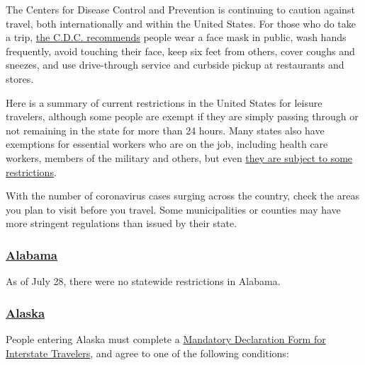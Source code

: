 The Centers for Disease Control and Prevention is continuing to caution
against travel, both internationally and within the United States. For
those who do take a trip,
\href{https://www.cdc.gov/coronavirus/2019-ncov/travelers/travel-in-the-us.html}{the
C.D.C. recommends} people wear a face mask in public, wash hands
frequently, avoid touching their face, keep six feet from others, cover
coughs and sneezes, and use drive-through service and curbside pickup at
restaurants and stores.

Here is a summary of current restrictions in the United States for
leisure travelers, although some people are exempt if they are simply
passing through or not remaining in the state for more than 24 hours.
Many states also have exemptions for essential workers who are on the
job, including health care workers, members of the military and others,
but even
\href{https://www.ncsl.org/research/labor-and-employment/covid-19-essential-workers-in-the-states.aspx}{they
are subject to some restrictions}.

With the number of coronavirus cases surging across the country, check
the areas you plan to visit before you travel. Some municipalities or
counties may have more stringent regulations than issued by their state.

\hypertarget{alabama}{%
\subsubsection{\texorpdfstring{\href{https://alabama.travel/my-trip/staying-safe}{Alabama}}{Alabama}}\label{alabama}}

As of July 28, there were no statewide restrictions in Alabama.

\hypertarget{alaska}{%
\subsubsection{\texorpdfstring{\href{https://covid19.alaska.gov/travelers/}{Alaska}}{Alaska}}\label{alaska}}

People entering Alaska must complete a
\href{https://covid19.alaska.gov/wp-content/uploads/2020/06/06112020-Mandate-10-Travel-declaration-form-Ver-2.0-6-10-f.pdf}{Mandatory
Declaration Form for Interstate Travelers}, and agree to one of the
following conditions:

